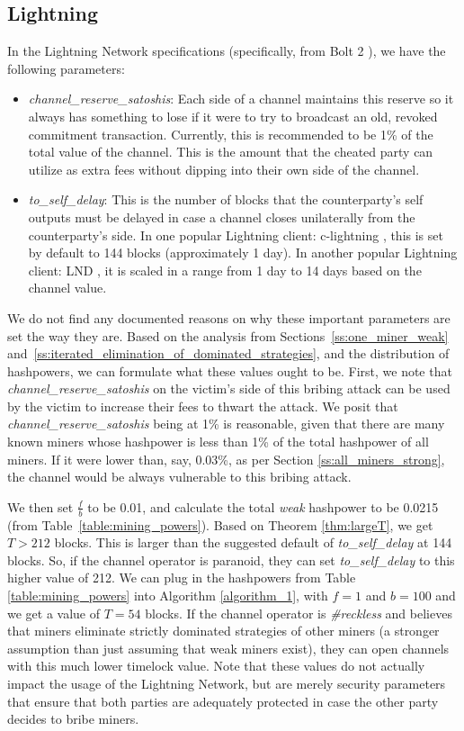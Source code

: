 \subsection{Lightning}
In the Lightning Network specifications (specifically, from Bolt 2 \cite{bolt_2}), we have the following parameters:
\begin{itemize}
    \item \emph{channel\_reserve\_satoshis}: Each side of a channel maintains this reserve so it always has something to lose if it were to try to broadcast an old, revoked commitment transaction. Currently, this is recommended to be 1\% of the total value of the channel. This is the amount that the cheated party can utilize as extra fees without dipping into their own side of the channel. 
    \item \emph{to\_self\_delay}: This is the number of blocks that the counterparty's self outputs must be delayed in case a channel closes unilaterally from the counterparty's side. In one popular Lightning client: c-lightning \cite{c_lightning}, this is set by default to 144 blocks (approximately 1 day). In another popular Lightning client: LND \cite{lnd}, it is scaled in a range from 1 day to 14 days based on the channel value. 
\end{itemize}
We do not find any documented reasons on why these important parameters are set the way they are. Based on the analysis from Sections~\ref{ss:one_miner_weak} and~\ref{ss:iterated_elimination_of_dominated_strategies}, and the distribution of hashpowers, we can formulate what these values ought to be. 
First, we note that \emph{channel\_reserve\_satoshis} on the victim's side of this bribing attack can be used by the victim to increase their fees to thwart the attack. We posit that \emph{channel\_reserve\_satoshis} being at 1\% is reasonable, given that there are many known miners whose hashpower is less than 1\% of the total hashpower of all miners. If it were lower than, say, 0.03\%, as per Section \ref{ss:all_miners_strong}, the channel would be always vulnerable to this bribing attack.     

We then set $\frac{f}{b}$ to be 0.01, and calculate the total \emph{weak} hashpower to be 0.0215 (from Table~\ref{table:mining_powers}). Based on Theorem \ref{thm:largeT}, we get $T > 212$ blocks. This is larger than the suggested default of \emph{to\_self\_delay} at 144 blocks. So, if the channel operator is paranoid, they can set \emph{to\_self\_delay} to this higher value of 212. We can plug in the hashpowers from Table \ref{table:mining_powers} into Algorithm \ref{algorithm_1}, with $f = 1$ and $b = 100$ and we get a value of $T = 54$ blocks. If the channel operator is \emph{\#reckless} and believes that miners eliminate strictly dominated strategies of other miners (a stronger assumption than just assuming that weak miners exist), they can open channels with this much lower timelock value. Note that these values do not actually impact the usage of the Lightning Network, but are merely security parameters that ensure that both parties are adequately protected in case the other party decides to bribe miners. 

